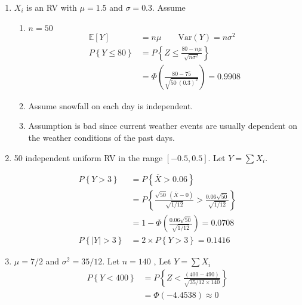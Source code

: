 \begin{enumerate}
	
	\item $ X_i $ is an RV with $ \mu = 1.5 $ and $ \sigma = 0.3 $. Assume \\
	
		\begin{enumerate}
			\item $ n = 50 $
			\begin{align}
				\mathbb{E}[Y] &= n\mu \qquad \mathrm{Var}(Y) = n\sigma^2 \nonumber \\
				P \left\{ Y \leq 80 \right\} &= P \left\{Z \leq \frac{80 - n\mu}{\sqrt{n\sigma^2}} \right\} \nonumber \\
				&= \Phi \left(\frac{80 - 75}{\sqrt{50\ (0.3)^2}}\right) = 0.9908
			\end{align}
			
			\item Assume snowfall on each day is independent.
			
			\item Assumption is bad since current weather events are usually dependent on the weather conditions of the past days.
			
		\end{enumerate}
	 
	
	\item 50 independent uniform RV in the range $ [-0.5, 0.5] $. Let $ Y = \sum X_i  $.
	
		\begin{align}
			P \left\{Y > 3 \right\} &= P \left\{ \overline{X} > 0.06 \right\} \nonumber \\
			&= P \left\{ \frac{\sqrt{50}\ (\overline{X} - 0)}{\sqrt{1/12}}> \frac{0.06 \sqrt{50}}{\sqrt{1/12}} \right\} \nonumber \\
			&= 1 - \Phi\left( \frac{0.06 \sqrt{50}}{\sqrt{1/12}} \right) = 0.0708 \nonumber \\
			P \left\{|Y| > 3 \right\} &= 2 \times P \left\{Y > 3 \right\} = 0.1416
		\end{align}
	
	
	\item $ \mu = 7/2 $ and $ \sigma^2 = 35/12 $. Let $ n = 140 $ , Let $ Y = \sum X_i $\\
	
		\begin{align}
			P \left\{Y < 400 \right\} &= P \left\{ Z < \frac{(400 - 490)}{\sqrt{35/12 \times 140}} \right\} \nonumber \\
			&= \Phi (-4.4538) \approx 0
		\end{align}
	

\end{enumerate}
